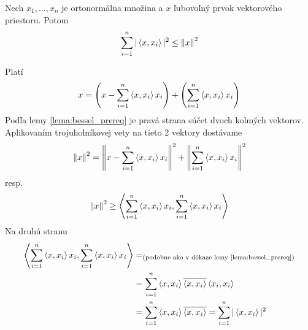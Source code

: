 \nocite{bessel}
\begin{veta}
    Nech ${x_1,\dots,x_n}$ je ortonormálna
    množina a $x$ ľubovoľný prvok vektorového priestoru. Potom
    \begin{equation*}
        \sum_{i=1}^n |\left\langle x,x_i \right\rangle|^2 \le \left\lVert x\right\rVert^2
    \end{equation*}
    \label{veta:besselova_nerovnost}
\end{veta}
\begin{dokaz}
    Platí
    \begin{equation*}
        x = \left( x- \sum_{i=1}^n \left\langle x,x_i \right\rangle x_i\right) +
            \left( \sum_{i=1}^n \left\langle x,x_i \right\rangle x_i \right)
    \end{equation*}
    Podľa lemy \ref{lema:bessel_prereq} je pravá strana súčet
    dvoch kolmých vektorov. Aplikovaním trojuholníkovej vety
    na tieto 2 vektory dostávame
    \begin{equation*}
        \left\lVert x\right\rVert^2 =
         \left\lVert x- \sum_{i=1}^n \left\langle x,x_i \right\rangle x_i\right\rVert^2 +
         \left\lVert\sum_{i=1}^n \left\langle x,x_i \right\rangle x_i\right\rVert^2
    \end{equation*}
    resp.
    \begin{equation*}
        \left\lVert x\right\rVert^2 \ge
          \left\langle \sum_{i=1}^n\left\langle x,x_i \right\rangle x_i,
          \sum_{i=1}^n\left\langle x,x_i \right\rangle x_i \right\rangle
    \end{equation*}
    Na druhú stranu
    \begin{equation*}
        \begin{split}
          \left\langle \sum_{i=1}^n\left\langle x,x_i \right\rangle x_i,
          \sum_{i=1}^n\left\langle x,x_i \right\rangle x_i \right\rangle 
          &=_\text{(podobne ako v dôkaze lemy \ref{lema:bessel_prereq})} \\
          &= \sum_{i=1}^n \left\langle x,x_i \right\rangle\overline{\left\langle x,x_i \right\rangle}
            \left\langle x_i,x_i \right\rangle \\ 
          &= \sum_{i=1}^n \left\langle x,x_i \right\rangle\overline{\left\langle x,x_i \right\rangle} =
          \sum_{i=1}^n |\left\langle x,x_i \right\rangle|^2
        \end{split}
    \end{equation*}
\end{dokaz}

